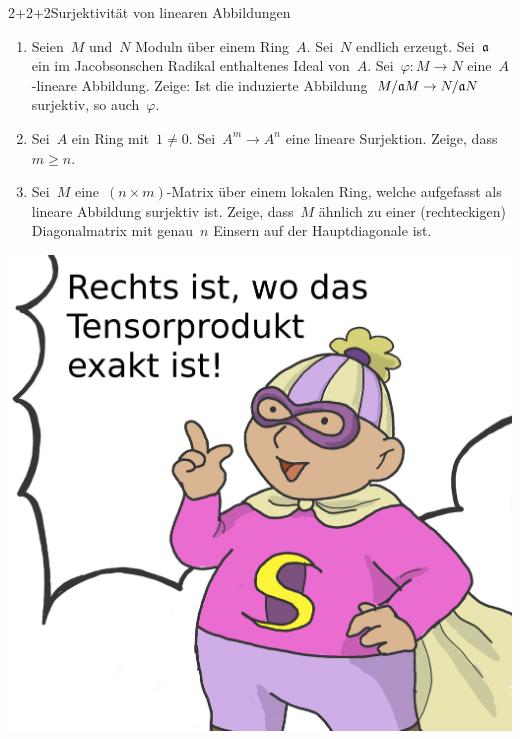 \documentclass{uebblatt}
\begin{document}
\begin{aufgabe}{2+2+2}{Surjektivität von linearen Abbildungen}
\begin{enumerate}
\item Seien~$M$ und~$N$ Moduln über einem Ring~$A$. Sei~$N$ endlich
erzeugt. Sei~$\mathfrak{a}$ ein im Jacobsonschen Radikal enthaltenes Ideal von~$A$.
Sei~$\varphi : M \to N$ eine~$A$-lineare Abbildung. Zeige: Ist die
induzierte Abbildung~$M/\mathfrak{a} M \to N/\mathfrak{a} N$ surjektiv, so auch~$\varphi$.
\item Sei~$A$ ein Ring mit~$1 \neq 0$. Sei~$A^m \to A^n$ eine lineare
Surjektion. Zeige, dass~$m \geq n$.
\item Sei~$M$ eine~$(n \times m)$-Matrix über einem lokalen Ring, welche
aufgefasst als lineare Abbildung surjektiv ist. Zeige, dass~$M$ ähnlich zu einer
(rechteckigen) Diagonalmatrix mit genau~$n$ Einsern auf der Hauptdiagonale ist.
\end{enumerate}
\end{aufgabe}

\centering
\includegraphics[scale=0.08]{images/rechts-ist-wo-das-tensorprodukt-exakt-ist}
\end{document}
